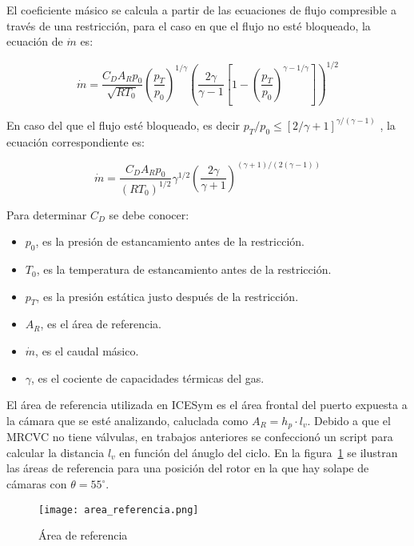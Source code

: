 El coeficiente másico se calcula a partir de las ecuaciones de flujo
compresible a través de una restricción, para el caso en que el flujo no esté
bloqueado, la ecuación de $\dot{m}$ es:

\begin{equation}
    \label{eq:m_not_choked}
    \dot{m} = \frac{C_D A_R p_0}{\sqrt{R T_0}}
            {\left(\frac{p_T}{p_0} \right)}^{1/\gamma}
            {\left( \frac{2\gamma}{\gamma-1} \left[1- {(\frac{p_T}{p_0})}^{{\gamma-1}/\gamma} \right] \right)}^{1/2}
\end{equation}

En caso del que el flujo esté bloqueado, es decir
$p_T/p_0 \le {[2/\gamma+1]}^{\gamma/(\gamma - 1)}$
, la ecuación correspondiente es:

\begin{equation}
  \dot{m}=  \frac {C_D A_R p_0} {{(R T_0)}^{1/2}}
            \gamma^{1/2}
            {\left( \frac{2\gamma}{\gamma+1} \right)}^{(\gamma+1)/(2(\gamma-1))}
\end{equation}

Para determinar $C_D$ se debe conocer:

\begin{itemize}
    \item $p_0$, es la presión de estancamiento antes de la restricción.
    \item $T_0$, es la temperatura de estancamiento antes de la restricción.
    \item $p_T$, es la presión estática justo después de la restricción.
    \item $A_R$, es el área de referencia.
    \item $\dot{m}$, es el caudal másico.
    \item $\gamma$, es el cociente de capacidades térmicas del gas.
\end{itemize}

El área de referencia utilizada en ICESym es el área frontal del puerto expuesta
a la cámara que se esté analizando, caluclada como $A_{R} = h_{p} \cdot l_{{v}}$.
%
Debido a que el MRCVC no tiene válvulas, en trabajos anteriores se confeccionó
un script para calcular la distancia $l_v$ en función del ánuglo del ciclo.
%
En la figura~\ref{fig:area_referencia} se ilustran las áreas de referencia para
una posición del rotor en la que hay solape de cámaras con $\theta = 55^\circ$.

\begin{figure}
    \centering
    \texttt{[image: area\_referencia.png]}
    \caption{Área de referencia}\label{fig:area_referencia}
\end{figure}

